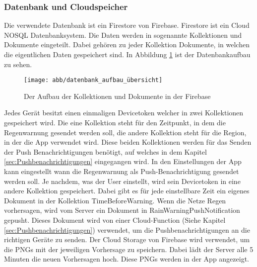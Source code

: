 \subsubsection{Datenbank und Cloudspeicher}\label{datenbank und cloudspeicher}
Die verwendete Datenbank ist ein Firestore von Firebase. Firestore ist ein Cloud NOSQL Datenbanksystem. 
Die Daten werden in sogenannte Kollektionen und Dokumente eingeteilt. 
Dabei gehören zu jeder Kollektion Dokumente, in welchen die eigentlichen Daten gespeichert sind. 
In Abbildung \ref{fig:datenbank_aufbau} ist der Datenbankaufbau zu sehen.
\begin{figure}[h]
 \centering
 \texttt{[image: abb/datenbank\_aufbau\_übersicht]}
 \caption[Datenbankarchitektur]{Der Aufbau der Kollektionen und Dokumente in der Firebase}
\label{fig:datenbank_aufbau}
\end{figure}

\begin{sloppypar}
Jedes Gerät besitzt einen einmaligen Devicetoken welcher in zwei Kollektionen gespeichert wird. 
Die eine Kollektion steht für den Zeitpunkt, in dem die Regenwarnung gesendet werden soll, die andere Kollektion steht für die Region, in der die App verwendet wird. 
Diese beiden Kollektionen werden für das Senden der Push Benachrichtigungen benötigt, auf welches in dem Kapitel \ref{sec:Pushbenachrichtigungen} eingegangen wird. 
In den Einstellungen der App kann eingestellt wann die Regenwarnung als Push-Benachrichtigung gesendet werden soll.
Je nachdem, was der User einstellt, wird sein Devicetoken in eine andere Kollektion gespeichert. 
Dabei gibt es für jede einstellbare Zeit ein eigenes Dokument in der Kollektion TimeBeforeWarning. 
Wenn die Netze Regen vorhersagen, wird vom Server ein Dokument in RainWarningPushNotification gepusht. 
Dieses Dokument wird von einer Cloud-Function (Siehe Kapitel \ref{sec:Pushbenachrichtigungen}) verwendet, um die Pushbenachrichtigungen an die richtigen Geräte zu senden.
Der Cloud Storage von Firebase wird verwendet, um die PNGs mit der jeweiligen Vorhersage zu speichern.
Dabei lädt der Server alle 5 Minuten die neuen Vorhersagen hoch. Diese PNGs werden in der App angezeigt.
\end{sloppypar}